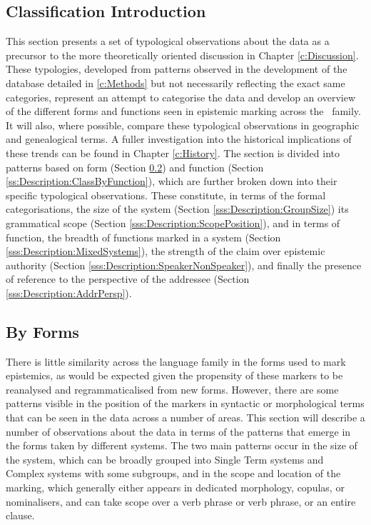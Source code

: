 \subsection{Classification Introduction}
This section presents a set of typological observations about the data as a precursor to the more theoretically oriented discussion in Chapter \ref{c:Discussion}. These typologies, developed from patterns observed in the development of the database detailed in \cref{c:Methods} but not necessarily reflecting the exact same categories, represent an attempt to categorise the data and develop an overview of the different forms and functions seen in epistemic marking across the \lfam\ family. It will also, where possible, compare these typological observations in geographic and genealogical terms. A fuller investigation into the historical implications of these trends can be found in Chapter \ref{c:History}. The section is divided into patterns based on form (Section \ref{ss:Description:ClassBySystem}) and function (Section \ref{ss:Description:ClassByFunction}), which are further broken down into their specific typological observations. These constitute, in terms of the formal categorisations, the size of the system (Section \ref{sss:Description:GroupSize}) its grammatical scope (Section \ref{sss:Description:ScopePosition}), and in terms of function, the breadth of functions marked in a system (Section \ref{sss:Description:MixedSystems}), the strength of the claim over epistemic authority (Section \ref{sss:Description:SpeakerNonSpeaker}), and finally the presence of reference to the perspective of the addressee (Section \ref{sss:Description:AddrPersp}).
\subsection{By Forms}\label{ss:Description:ClassBySystem}
There is little similarity across the language family in the forms used to mark epistemics, as would be expected given the propensity of these markers to be reanalysed and regrammaticalised from new forms. However, there are some patterns visible in the position of the markers in syntactic or morphological terms that can be seen in the data across a number of areas. This section will describe a number of observations about the data in terms of the patterns that emerge in the forms taken by different systems. The two main patterns occur in the size of the system, which can be broadly grouped into Single Term systems and Complex systems with some subgroups, and in the scope and location of the marking, which generally either appears in dedicated morphology, copulas, or nominalisers, and can take scope over a verb phrase or verb phrase, or an entire clause.
